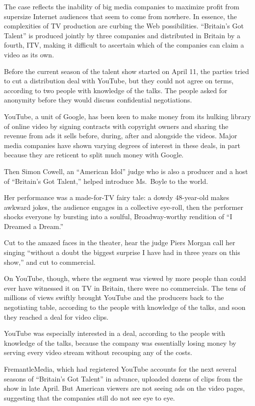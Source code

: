 \documentclass[12pt,a4paper,onecolumn]{article}
\begin{document}
The case reflects the inability of big media companies to maximize profit from supersize Internet
audiences that seem to come from nowhere. In essence, the complexities of TV production are curbing
the Web possibilities. ``Britain's Got Talent'' is produced jointly by three companies and
distributed in Britain by a fourth, ITV, making it difficult to ascertain which of the companies can
claim a video as its own.

Before the current season of the talent show started on April 11, the parties tried to cut a
distribution deal with YouTube, but they could not agree on terms, according to two people with
knowledge of the talks. The people asked for anonymity before they would discuss confidential
negotiations.

YouTube, a unit of Google, has been keen to make money from its hulking library of online video by
signing contracts with copyright owners and sharing the revenue from ads it sells before, during,
after and alongside the videos. Major media companies have shown varying degrees of interest in
these deals, in part because they are reticent to split much money with Google.

Then Simon Cowell, an ``American Idol'' judge who is also a producer and a host of ``Britain's Got
Talent,'' helped introduce Ms.~Boyle to the world.

Her performance was a made-for-TV fairy tale: a dowdy 48-year-old makes awkward jokes, the audience
engages in a collective eye-roll, then the performer shocks everyone by bursting into a soulful,
Broadway-worthy rendition of ``I Dreamed a Dream.''

Cut to the amazed faces in the theater, hear the judge Piers Morgan call her singing ``without a
doubt the biggest surprise I have had in three years on this show,'' and cut to commercial.

On YouTube, though, where the segment was viewed by more people than could ever have witnessed it on
TV in Britain, there were no commercials. The tens of millions of views swiftly brought YouTube and
the producers back to the negotiating table, according to the people with knowledge of the talks,
and soon they reached a deal for video clips.

YouTube was especially interested in a deal, according to the people with knowledge of the talks,
because the company was essentially losing money by serving every video stream without recouping any
of the costs.

FremantleMedia, which had registered YouTube accounts for the next several seasons of ``Britain's
Got Talent'' in advance, uploaded dozens of clips from the show in late April. But American viewers
are not seeing ads on the video pages, suggesting that the companies still do not see eye to eye.
\end{document}
